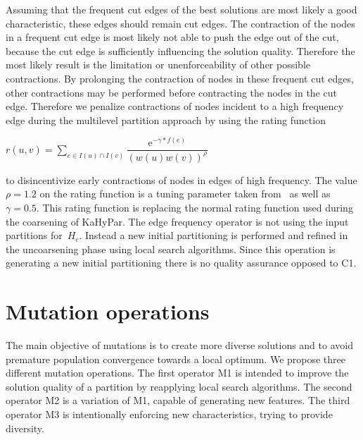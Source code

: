 \documentclass[a4paper,12pt,titlepage, BCOR7mm,headsepline]{scrbook}
\numberwithin{equation}{section}
\begin{document}
Assuming that the frequent cut edges of the best solutions are most likely a good characteristic, these edges should remain cut edges.
The contraction of the nodes in a frequent cut edge is most likely not able to push the edge out of the cut, because the cut edge is sufficiently influencing the solution quality. Therefore the most likely result is the limitation or unenforceability of other possible contractions.
By prolonging the contraction of nodes in these frequent cut edges, other contractions may be performed before contracting the nodes in the cut edge.
 Therefore we penalize contractions of nodes incident to a high frequency edge during the multilevel partition approach by using the rating function
\begin{center}
$r(u,v) = \sum_{e \in I(u) \cap I(v)}\dfrac{\mathrm{e}^{-\gamma*f(e)}}{(w(u)w(v))^{\rho}}$ 
\end{center}





to disincentivize early contractions of nodes in edges of high frequency. The value $\rho = 1.2$ on the rating function is a tuning parameter taken from~\cite{delling2011graph} as well as $\gamma = 0.5$.
This rating function is replacing the normal rating function used during the coarsening of KaHyPar. 
The edge frequency operator is not using the input partitions for~$H_c$. Instead a new initial partitioning is performed and refined in the uncoarsening phase using local search algorithms.
Since this operation is generating a new initial partitioning there is no quality assurance opposed to C1.
\section{Mutation operations}
\label{sec:mutations}
The main objective of mutations is to create more diverse solutions and to avoid premature population convergence towards a local optimum.
We propose three different mutation operations. The first operator M1 is intended to improve the solution quality of a partition by reapplying local search algorithms. The second operator M2 is a variation of M1, capable of generating new features. The third operator M3 is intentionally enforcing new characteristics, trying to provide diversity.
\end{document}
